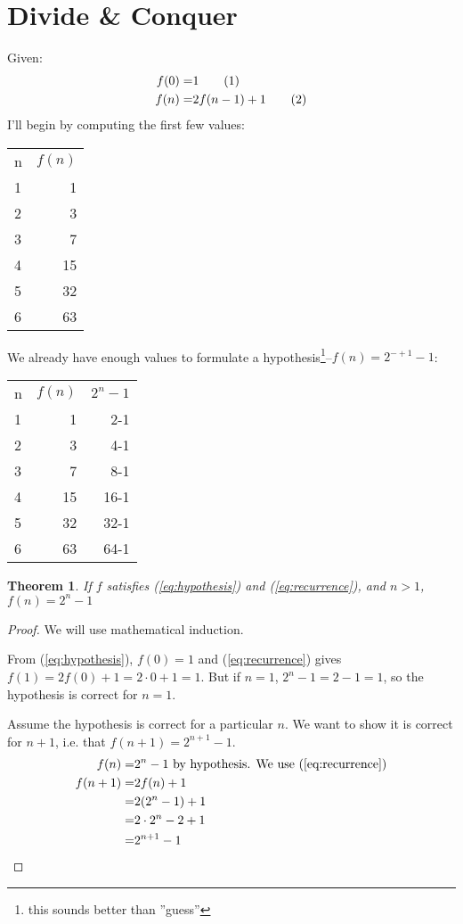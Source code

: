 \documentclass[]{article}
\newcommand\numberthis{\addtocounter{equation}{1}\tag{\theequation}}
\newtheorem{thm}{Theorem}
\begin{document}
\section{Divide \& Conquer}
Given:
\begin{align*}
	f(0)=&1 \numberthis \label{eq:hypothesis}\\
	f(n)=&2f(n-1)+1 \numberthis \label{eq:recurrence}
\end{align*}
I'll begin by computing the first few values:
\begin{table}[H]
	\begin{center}
		\begin{tabular}{|l|r|}
			n&$f(n)$\\
			1&1\\
			2&3\\
			3&7\\
			4&15\\
			5&32\\
			6&63
		\end{tabular}
	\end{center}
\end{table}
We already have enough values to formulate a hypothesis\footnote{this sounds better than ''guess''}--$f(n)=2^{-+1}-1$:
\begin{table}[H]
	\begin{center}
		\begin{tabular}[H]{|l|r|r|}
			n&$f(n)$&$2^n-1$\\
			1&1&2-1\\
			2&3&4-1\\
			3&7&8-1\\
			4&15&16-1\\
			5&32&32-1\\
			6&63&64-1
		\end{tabular}
	\end{center}
\end{table}

\begin{thm}
	If $f$ satisfies (\ref{eq:hypothesis}) and (\ref{eq:recurrence}), and $n>1$, $f(n)=2^n-1$
\end{thm}

\begin{proof}
	We will use mathematical induction. 
	
	From (\ref{eq:hypothesis}), $f(0)=1$ and (\ref{eq:recurrence}) gives $f(1)= 2f(0)+1 = 2\cdot0+1 =1$. But if $n=1$, $2^n-1=2-1=1$, so the hypothesis is correct for $n=1$.
	
	Assume the hypothesis is correct for a particular $n$. We want to show it is correct for $n+1$, i.e. that $f(n+1)=2^{n+1}-1$.
	\begin{align*}
		f(n)=&2^n-1	\text{ by hypothesis. We use (\ref{eq:recurrence})}\\
		f(n+1)=&2f(n) + 1 \\
		=& 2(2^n-1) + 1\\
		=& 2\cdot 2^n -2 +1\\
		=& 2^{n+1} -1
	\end{align*}
\end{proof}
\end{document}
